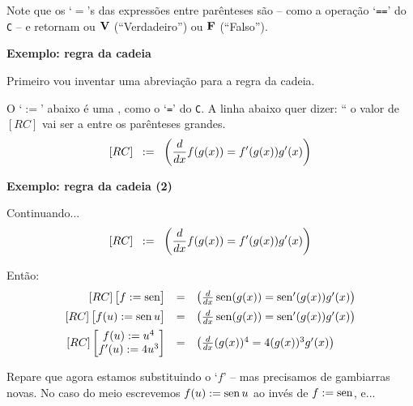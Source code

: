\documentclass[oneside,12pt]{article}
\begin{document}
Note que os `$=$'s das expressões entre parênteses são
 -- como a operação `\texttt{==}' do \texttt{C}
-- e retornam ou $\mathbf{V}$ (``Verdadeiro'') ou $\mathbf{F}$ (``Falso'').

\newpage


{\bf Exemplo: regra da cadeia}

Primeiro vou inventar uma abreviação para a regra da cadeia.


\msk

O `$:=$' abaixo é uma , como o `\texttt{=}' do
\texttt{C}. A linha abaixo quer dizer: ``
o valor de $[RC]$ vai ser a  entre os parênteses
grandes.
%
$$[RC] \;\; := \;\; \left( \frac{d}{dx} f(g(x)) = f'(g(x))g'(x) \right)$$

\newpage


{\bf Exemplo: regra da cadeia (2)}

Continuando...
%
$$[RC] \;\; := \;\; \left( \frac{d}{dx} f(g(x)) = f'(g(x))g'(x) \right)$$

Então:
%
$$\begin{array}{rcl}
  [RC] \left [\begin{matrix}f := \operatorname{sen}\end{matrix}\right ] &=&
     \left( \frac{d}{dx} \operatorname{sen}(g(x)) = \operatorname{sen}'(g(x))g'(x) \right) \\[5pt]
  [RC] \left [\begin{matrix}f(u) := \operatorname{sen} u\end{matrix}\right ] &=&
     \left( \frac{d}{dx} \operatorname{sen}(g(x)) = \operatorname{sen}'(g(x))g'(x) \right) \\[5pt]
  [RC] \left [\begin{matrix}f(u) := u^4 \\ f'(u) := 4u^3 \end{matrix}\right ] &=&
     \left( \frac{d}{dx} (g(x))^4 = 4(g(x))^3g'(x) \right) \\
  \end{array}
$$

Repare que agora estamos substituindo o `$f$'  -- mas precisamos de gambiarras novas. No caso
do meio escrevemos $f(u) := \operatorname{sen} u$ ao invés de $f := \operatorname{sen}$, e...


\newpage

\end{document}
